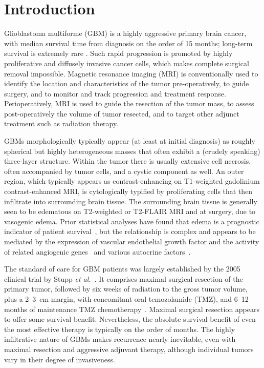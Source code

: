 \documentclass{aims}
\numberwithin{equation}{section}
\begin{document}
\section{Introduction}

Glioblastoma multiforme (GBM) is a highly aggressive primary brain cancer,
with median survival time from diagnosis on the order of 15 months;
long-term survival is extremely rare \cite{Norden2006}.  Such rapid
progression is promoted by highly proliferative and diffusely invasive
cancer cells, which makes complete surgical removal impossible. Magnetic
resonance imaging (MRI) is conventionally used to identify the location and
characteristics of the tumor pre-operatively, to guide surgery, and to
monitor and track progression and treatment response. Perioperatively, MRI
is used to guide the resection of the tumor mass, to assess post-operatively
the volume of tumor resected, and to target other adjunct treatment such as
radiation therapy.

GBMs morphologically typically appear (at least at initial diagnosis) as
roughly spherical but highly heterogeneous masses that often exhibit a
(crudely speaking) three-layer structure.  Within the tumor there is usually
extensive cell necrosis, often accompanied by tumor cells, and a cystic
component as well.  An outer region, which typically appears as
contrast-enhancing on T1-weighted gadolinium contrast-enhanced MRI, is
cytologically typified by proliferating cells that then infiltrate into
surrounding brain tissue.  The surrounding brain tissue is generally seen to
be edematous on T2-weighted or T2-FLAIR MRI and at surgery, due to vasogenic
edema.  Prior statistical analyses have found that edema is a prognostic
indicator of patient survival~\cite{Pope2005}, but the relationship is
complex and appears to be mediated by the expression of vascular endothelial
growth factor and the activity of related angiogenic
genes~\cite{Carlson2007} and various autocrine
factors~\cite{Hoelzinger2007}.

The standard of care for GBM patients was largely established by the 2005
clinical trial by Stupp \emph{et al.}~\cite{Stupp2005}.  It comprises
maximal surgical resection of the primary tumor, followed by six weeks of
radiation to the gross tumor volume, plus a 2--3~cm margin, with concomitant
oral temozolamide (TMZ), and 6--12 months of maintenance TMZ chemotherapy~\cite{Gilbert2013}.  Maximal surgical resection
appears to offer some
survival benefit.  Nevertheless, the absolute survival benefit of even the
most effective therapy is typically on the order of months.  The highly
infiltrative nature of GBMs makes recurrence nearly inevitable,
even with maximal resection and aggressive adjuvant therapy,
although individual tumors vary in their degree of invasiveness.
\end{document}
